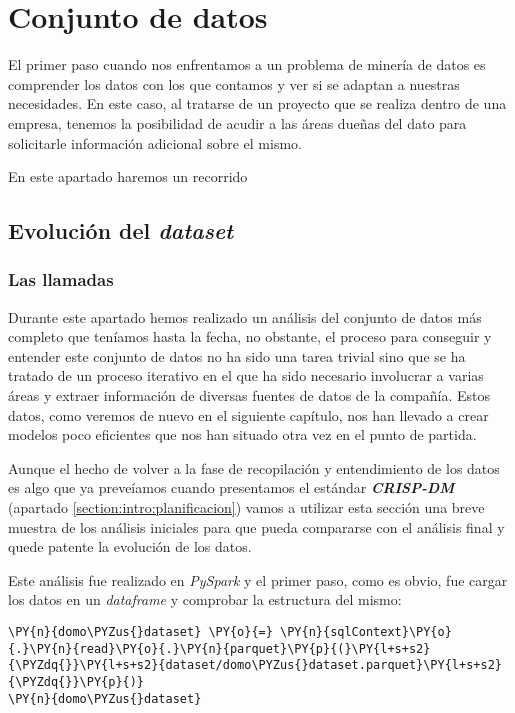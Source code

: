 \chapter{Conjunto de datos}
\label{chapter:dataset}
El primer paso cuando nos enfrentamos a un problema de minería de datos es comprender los datos con los que contamos y ver si se adaptan a nuestras necesidades. En este caso, al tratarse de un proyecto que se realiza dentro de una empresa, tenemos la posibilidad de acudir a las áreas dueñas del dato para solicitarle información adicional sobre el mismo. 

En este apartado haremos un recorrido 



\section{Evolución del \textit{dataset}}

\subsection{Las llamadas}

Durante este apartado hemos realizado un análisis del conjunto de datos más completo que teníamos hasta la fecha, no obstante, el proceso para conseguir y entender este conjunto de datos no ha sido una tarea trivial sino que se ha tratado de un proceso iterativo en el que ha sido necesario involucrar a varias áreas y extraer información de diversas fuentes de datos de la compañía. Estos datos, como veremos de nuevo en el siguiente capítulo, nos han llevado a crear modelos poco eficientes que nos han situado otra vez en el punto de partida. 

Aunque el hecho de volver a la fase de recopilación y entendimiento de los datos es algo que ya preveíamos cuando presentamos el estándar \textbf{\textit{CRISP-DM}} (apartado \ref{section:intro:planificacion}) vamos a utilizar esta sección una breve muestra de los análisis iniciales para que pueda compararse con el análisis final y quede patente la evolución de los datos.



Este análisis fue realizado en \textit{PySpark} y el primer paso, como es obvio, fue cargar los datos en un \textit{dataframe} y comprobar la estructura del mismo: 


\vspace{0.5cm}

\begin{tcolorbox}[breakable, size=fbox, boxrule=1pt, pad at break*=1mm,colback=cellbackground, colframe=cellborder]
\begin{Verbatim}[commandchars=\\\{\}]
\PY{n}{domo\PYZus{}dataset} \PY{o}{=} \PY{n}{sqlContext}\PY{o}{.}\PY{n}{read}\PY{o}{.}\PY{n}{parquet}\PY{p}{(}\PY{l+s+s2}{\PYZdq{}}\PY{l+s+s2}{dataset/domo\PYZus{}dataset.parquet}\PY{l+s+s2}{\PYZdq{}}\PY{p}{)}
\PY{n}{domo\PYZus{}dataset}
\end{Verbatim}
\end{tcolorbox}


